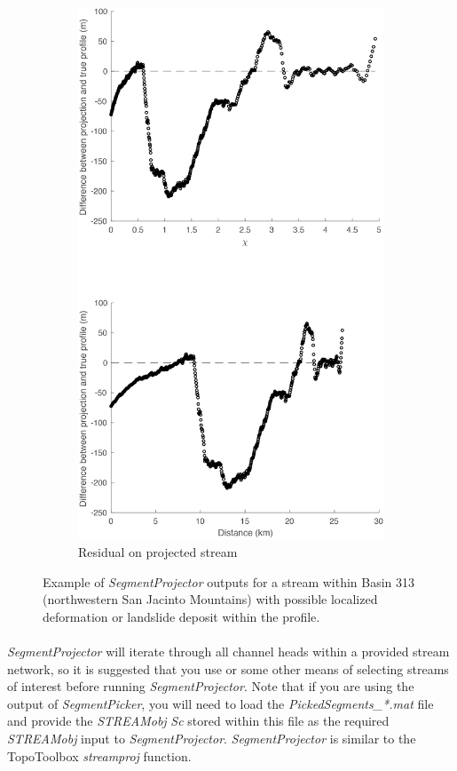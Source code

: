 \begin{figure}[H]
\begin{subfigure}{.5\textwidth}
		\includegraphics[width=.8\linewidth]{PNGs/B313_ProjResidual_1.png}
		\caption{Residual on projected stream}
		\label{fig:p2sub2}
	\end{subfigure}
	\caption{Example of \textit{SegmentProjector} outputs for a stream within Basin 313 (northwestern San Jacinto Mountains) with possible localized deformation or landslide deposit within the profile.}
	\label{fig:proj2}
\end{figure}

\paragraph{}\textit{SegmentProjector} will iterate through all channel heads within a provided stream network, so it is suggested that you use  or some other means of selecting streams of interest before running \textit{SegmentProjector}. Note that if you are using the output of \textit{SegmentPicker}, you will need to load the \textit{PickedSegments\_*.mat} file and provide the \textit{STREAMobj} \textit{Sc} stored within this file as the required \textit{STREAMobj} input to \textit{SegmentProjector}. \textit{SegmentProjector} is similar to the TopoToolbox \textit{streamproj} function.

